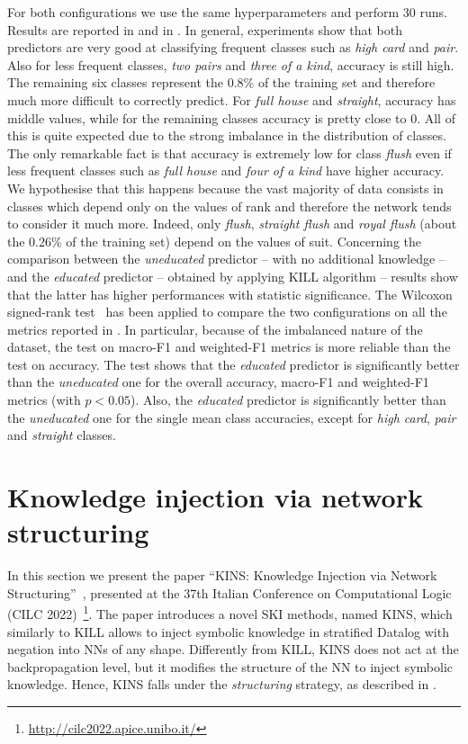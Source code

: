 %
For both configurations we use the same hyperparameters and perform $30$ runs.
%
Results are reported in  and in .
%
In general, experiments show that both predictors are very good at classifying frequent classes such as \emph{high card} and \emph{pair}.
%
Also for less frequent classes, \emph{two pairs} and \emph{three of a kind}, accuracy is still high.
%
The remaining six classes represent the $0.8\%$ of the training set and therefore much more difficult to correctly predict.
%
For \emph{full house} and \emph{straight}, accuracy has middle values, while for the remaining classes accuracy is pretty close to $0$.
%
All of this is quite expected due to the strong imbalance in the distribution of classes.
%
The only remarkable fact is that accuracy is extremely low for class \emph{flush} even if less frequent classes such as \emph{full house} and \emph{four of a kind} have higher accuracy.
%
We hypothesise that this happens because the vast majority of data consists in classes which depend only on the values of rank and therefore the network tends to consider it much more.
%
Indeed, only \emph{flush}, \emph{straight flush} and \emph{royal flush} (about the $0.26\%$ of the training set) depend on the values of suit.
%
Concerning the comparison between the \emph{uneducated} predictor -- with no additional knowledge -- and the \emph{educated} predictor -- obtained by applying KILL algorithm -- results show that the latter has higher performances with statistic significance.
%
The Wilcoxon signed-rank test~\cite{wilcoxon1945} has been applied to compare the two configurations on all the metrics reported in .
%
In particular, because of the imbalanced nature of the dataset, the test on macro-F1 and weighted-F1 metrics is more reliable than the test on accuracy.
%
The test shows that the \emph{educated} predictor is significantly better than the \emph{uneducated} one for the overall accuracy, macro-F1 and weighted-F1 metrics (with $p < 0.05$).
%
Also, the \emph{educated} predictor is significantly better than the \emph{uneducated} one for the single mean class accuracies, except for \emph{high card}, \emph{pair} and \emph{straight} classes.


\section{Knowledge injection via network structuring}\label{sec:ski-contribution-kins}
%
In this section we present the paper ``KINS: Knowledge Injection via Network Structuring''~\cite{kins-cilc2022}, presented at the 37th Italian Conference on Computational Logic (CILC 2022)~\footnote{\url{http://cilc2022.apice.unibo.it/}}.
%
The paper introduces a novel \gls{SKI} methods, named \gls{KINS}, which similarly to \gls{KILL} allows to inject symbolic knowledge in stratified Datalog with negation into \glspl{NN} of any shape.
%
Differently from \gls{KILL}, \gls{KINS} does not act at the backpropagation level, but it modifies the structure of the \gls{NN} to inject symbolic knowledge.
%
Hence, \gls{KINS} falls under the \emph{structuring} strategy, as described in .


